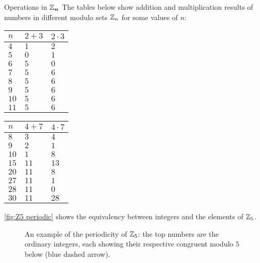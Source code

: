 \begin{example}{Operations in $\bm{\mathbb{Z}_{n}}$}{}
	The tables below show addition and multiplication results of numbers in different modulo sets $\mathbb{Z}_{n}$ for some values of $n$:

	\vspace{1em}
	\centering
	\begin{tabular}[]{lll}
		\toprule
		$n$ & $2+3$ & $2\cdot3$\\
		\midrule
		$4$  & $1$ & $2$\\
		$5$  & $0$ & $1$\\
		$6$  & $5$ & $0$\\
		$7$  & $5$ & $6$\\
		$8$  & $5$ & $6$\\
		$9$  & $5$ & $6$\\
		$10$ & $5$ & $6$\\
		$11$ & $5$ & $6$\\
		\bottomrule
	\end{tabular}
	\hspace{1cm}
	\begin{tabular}[]{lll}
		\toprule
		$n$ & $4+7$ & $4\cdot7$\\
		\midrule
		$8$  & $3$  & $4$\\
		$9$  & $2$  & $1$\\
		$10$ & $1$  & $8$\\
		$15$ & $11$ & $13$\\
		$20$ & $11$ & $8$\\
		$27$ & $11$ & $1$\\
		$28$ & $11$ & $0$\\
		$30$ & $11$ & $28$\\
		\bottomrule
	\end{tabular}
\end{example}

\autoref{fig:Z5 periodic} shows the equivalency between integers and the elements of $\mathbb{Z}_{5}$.

\begin{figure}[h]
	\centering
	\caption{An example of the periodicity of $\mathbb{Z}_{5}$: the top numbers are the ordinary integers, each showing their respective congruent modulo $5$ below (blue dashed arrow).}
	\label{fig:Z5 periodic}
\end{figure}


